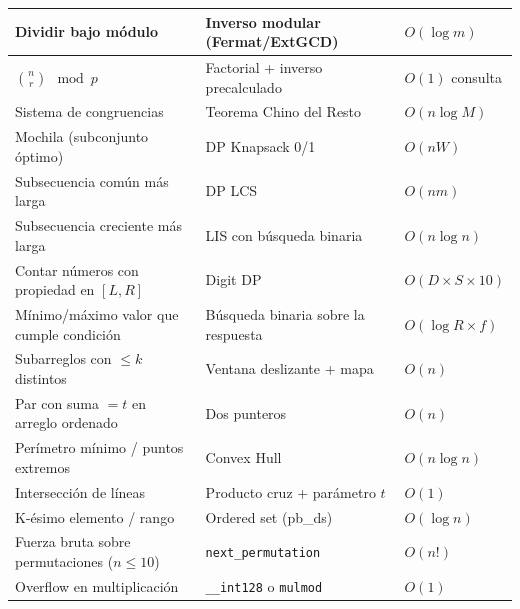 \documentclass[10pt,a4paper]{article}
\begin{document}
\begin{center}
\begin{longtable}{|p{6.5cm}|p{6.5cm}|p{3cm}|}
\hline
Dividir bajo m\'odulo & Inverso modular (Fermat/ExtGCD) & $O(\log m)$ \\
\hline
$\binom{n}{r} \mod p$ & Factorial + inverso precalculado & $O(1)$ consulta \\
\hline
Sistema de congruencias & Teorema Chino del Resto & $O(n \log M)$ \\
\hline
Mochila (subconjunto \'optimo) & DP Knapsack 0/1 & $O(nW)$ \\
\hline
Subsecuencia com\'un m\'as larga & DP LCS & $O(nm)$ \\
\hline
Subsecuencia creciente m\'as larga & LIS con b\'usqueda binaria & $O(n \log n)$ \\
\hline
Contar n\'umeros con propiedad en $[L,R]$ & Digit DP & $O(D \times S \times 10)$ \\
\hline
M\'inimo/m\'aximo valor que cumple condici\'on & B\'usqueda binaria sobre la respuesta & $O(\log R \times f)$ \\
\hline
Subarreglos con $\leq k$ distintos & Ventana deslizante + mapa & $O(n)$ \\
\hline
Par con suma $= t$ en arreglo ordenado & Dos punteros & $O(n)$ \\
\hline
Per\'imetro m\'inimo / puntos extremos & Convex Hull & $O(n \log n)$ \\
\hline
Intersecci\'on de l\'ineas & Producto cruz + par\'ametro $t$ & $O(1)$ \\
\hline
K-\'esimo elemento / rango & Ordered set (pb\_ds) & $O(\log n)$ \\
\hline
Fuerza bruta sobre permutaciones ($n \leq 10$) & \texttt{next\_permutation} & $O(n!)$ \\
\hline
Overflow en multiplicaci\'on & \texttt{\_\_int128} o \texttt{mulmod} & $O(1)$ \\
\hline
\end{longtable}
\end{center}
\end{document}
